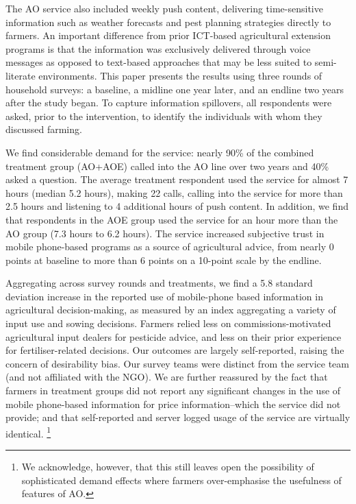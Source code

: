 \documentclass[12pt]{article}
\begin{document}
{\normalsize The AO service also included weekly push content, delivering
time-sensitive information such as weather forecasts and pest planning
strategies directly to farmers. An important difference from prior ICT-based
agricultural extension programs is that the information was exclusively
delivered through voice messages as opposed to text-based approaches that
may be less suited to semi-literate environments. This paper presents the
results using three rounds of household surveys: a baseline, a midline one
year later, and an endline two years after the study began. To capture
information spillovers, all respondents were asked, prior to the
intervention, to identify the individuals with whom they discussed farming.}

{\normalsize We find considerable demand for the service: nearly 90\% of the combined treatment group (AO+AOE)
called into the AO line over two years and 40\% asked a
question. The average treatment respondent used the service
for almost 7 hours (median 5.2 hours), making 22 calls, calling into the
service for more than 2.5 hours and listening to 4 additional hours of push
content. In addition, we find that respondents in the AOE group used the
service for an hour more than the AO group (7.3 hours to 6.2 hours). The service
increased  subjective trust in mobile phone-based programs as a
source of agricultural advice, from nearly 0 points at
baseline to more than 6 points on a 10-point scale by the endline. }

{\normalsize Aggregating across survey rounds and treatments, we find a 5.8 standard deviation increase in
the reported use of mobile-phone based information in agricultural
decision-making, as measured by
an index aggregating a variety of input use and sowing decisions. Farmers
relied less on commissions-motivated agricultural input dealers for
pesticide advice, and less on their prior experience for fertiliser-related
decisions. Our outcomes are largely self-reported, raising the concern of 
desirability bias. Our survey teams were distinct from the service team (and not affiliated with the NGO). We are further reassured by the fact that farmers in 
treatment groups did not report any significant changes in the use of mobile
phone-based information for price information--which the service did not
provide; and that self-reported and server logged usage of the service are
virtually identical.} \footnote{We acknowledge, however, that this still leaves open the possibility of sophisticated demand effects where farmers over-emphasise the usefulness of features of AO.}
\end{document}
